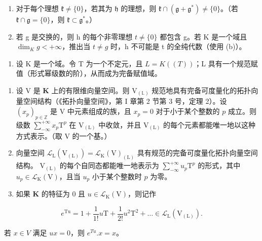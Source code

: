 \begin{enumerate}
\def\labelenumi{(\alph{enumi})}
\setcounter{enumi}{2}
\item
  对于每个理想 \(\mathfrak{k} \neq \{0\}\)，若其为 \(\mathfrak{h}\) 的理想，则 \(\mathfrak{k} \cap (\mathfrak{g} + \mathfrak{g}^*) \neq \{0\}\)。（若 \(\mathfrak{k} \cap \mathfrak{g} = \{0\}\)，则 \(\mathfrak{k} \subset \mathfrak{g}^*\)。）
\item
  若 g 是交换的，则 h 的每个非零理想 \(t \neq \{0\}\) 都包含 g。若 K 是一个域且 \(\dim_{K} g < +\infty\)，推出当 \(t \neq g\) 时，h 不可能是 t 的全纯代数（使用 (b)）。
\end{enumerate}

\begin{enumerate}
\def\labelenumi{\arabic{enumi}.}
\setcounter{enumi}{16}
\tightlist
\item
  设 K 是一个域。令 T 为一个不定元，且 \(L = K((T))\)；L 具有一个规范赋值（形式幂级数的阶），从而成为完备赋值域。
\end{enumerate}

\begin{enumerate}
\def\labelenumi{(\alph{enumi})}
\item
  设 \(\mathrm{V}\) 是 \(\mathbf{K}\) 上的有限维向量空间。则 \(\mathrm{V}_{(\mathbb{L})}\) 规范地具有完备可度量化的拓扑向量空间结构（《拓扑向量空间》，第 I 章第 2 节第 3 号，定理 2）。设 \((x_{p})_{p\in \mathbb{Z}}\) 是 \(\mathrm{V}\) 中元素组成的族，且 \(x_{p} = 0\) 对于小于某个整数的 \(p\) 成立。则级数 \(\sum_{-\infty}^{+\infty}x_p\mathrm{T}^p\) 在 \(\mathrm{V}_{(\mathrm{L})}\) 中收敛，并且 \(\mathrm{V}_{(\mathrm{L})}\) 的每个元素都能唯一地以这种方式表示。（取 V 的一个基。）
\item
  向量空间 \(\mathcal{L}_{\mathrm{L}}(\mathrm{V}_{(\mathrm{L})}) = \mathcal{L}_{\mathrm{K}}(\mathrm{V})_{(\mathrm{L})}\) 具有规范的完备可度量化拓扑向量空间结构。 \(\mathrm{V}_{(\mathrm{L})}\) 的每个自同态都能唯一地表示为 \(\sum_{-\infty}^{+\infty}u_p\mathrm{T}^p\) 的形式，其中 \(u_{p}\in \mathcal{L}_{\mathrm{K}}(\mathrm{V})\)，且当 \(u_{p}\) 小于某个整数时 \(p\) 为零。
\item
  如果 \(\mathbf{K}\) 的特征为 0 且 \(u\in \mathcal{L}_{\mathrm{K}}(\mathrm{V})\)，则记作
\end{enumerate}

\[
e ^ {\mathrm{Tu}} = 1 + \frac {1}{1 !} u \mathrm{T} + \frac {1}{2 !} u ^ {2} \mathrm{T} ^ {2} + \dots \in \mathcal {L} _ {\mathrm{L}} (\mathrm{V} _ {(\mathrm{L})}).
\]

若 \(x \in V\) 满足 \(ux = 0\)，则 \(e^{Tu}.x = x\)。

